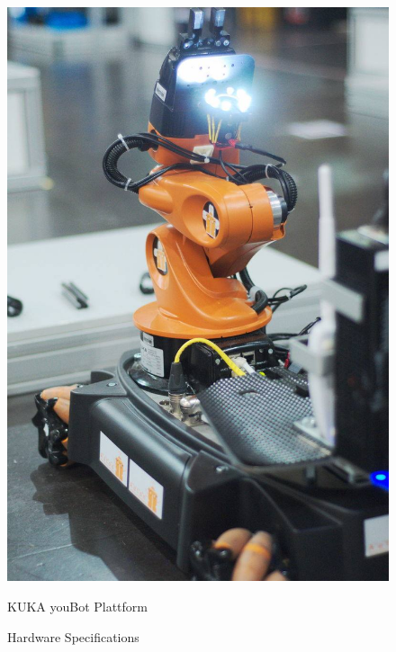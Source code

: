 \begin{figure}[htbp]
	\begin{minipage}{0.45\textwidth}
		\includegraphics[width=\textwidth]{img/YoubotInAction.jpg}
		\caption{KUKA youBot Plattform}
		\label{fig:youBot}
	\end{minipage}
	\hfill
	\begin{minipage}{0.45\textwidth}
	\renewcommand*\figurename{Tab.}
	\setcounter{figure}{0}
	\centering
			\label{tab:hw}
			\caption{Hardware Specifications}
			

\end{minipage}
\end{figure}
